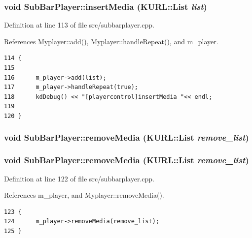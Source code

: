 \subsubsection{\setlength{\rightskip}{0pt plus 5cm}void Sub\-Bar\-Player::insert\-Media (KURL::List {\em list})\hspace{0.3cm}{\tt  [slot]}}\label{classSubBarPlayer_SubBarPlayeri11}




Definition at line 113 of file src/subbarplayer.cpp.

References Myplayer::add(), Myplayer::handle\-Repeat(), and m\_\-player.



\footnotesize\begin{verbatim}114 {
115      
116      m_player->add(list);
117      m_player->handleRepeat(true);
118      kdDebug() << "[playercontrol]insertMedia "<< endl; 
119      
120 }
\end{verbatim}\normalsize 
{}
\subsubsection{\setlength{\rightskip}{0pt plus 5cm}void Sub\-Bar\-Player::remove\-Media (KURL::List {\em remove\_\-list})\hspace{0.3cm}{\tt  [slot]}}\label{classSubBarPlayer_SubBarPlayeri30}


\subsubsection{\setlength{\rightskip}{0pt plus 5cm}void Sub\-Bar\-Player::remove\-Media (KURL::List {\em remove\_\-list})\hspace{0.3cm}{\tt  [slot]}}\label{classSubBarPlayer_SubBarPlayeri12}




Definition at line 122 of file src/subbarplayer.cpp.

References m\_\-player, and Myplayer::remove\-Media().



\footnotesize\begin{verbatim}123 {
124      m_player->removeMedia(remove_list); 
125 }
\end{verbatim}\normalsize 
{}
